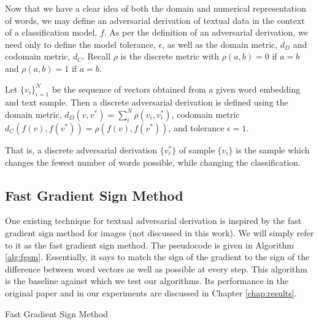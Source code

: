 \label{sec:adversarial_text_derivation}
\noindent
Now that we have a clear idea of both the domain and numerical representation of words, we may define an adversarial derivation of textual data in the context of a classification model, $f$.  As per the definition of an adversarial derivation, we need only to define the model tolerance, $\epsilon$, as well as the domain metric, $d_D$ and codomain metric, $d_C$.  Recall $\rho$ is the discrete metric with $\rho(a,b) = 0$ if $a=b$ and $\rho(a,b)=1$ if $a=b$.

\begin{definition}
Let $\{v_i\}_{i=1}^N$ be the sequence of vectors obtained from a given word embedding and text sample.  Then a discrete adversarial derivation is defined using the domain metric, $d_D(v,v^*) = \sum_i^N\rho(v_i,v_i^*)$, codomain metric $d_C(f(v),f(v^*)) = \rho(f(v),f(v^*))$, and tolerance $\epsilon = 1$.
\end{definition}

\noindent
That is, a discrete adversarial derivation $\{v_i^*\}$ of sample $\{v_i\}$ is the sample which changes the fewest number of words possible, while changing the classification.  
\subsection{Fast Gradient Sign Method}
One existing technique for textual adversarial derivation is inspired by the fast gradient sign method for images (not discussed in this work).  We will simply refer to it as the fast gradient sign method.  The pseudocode is given in Algorithm \ref{alg:fgsm}. \cite{np16}  Essentially, it says to match the sign of the gradient to the sign of the difference between word vectors as well as possible at every step.  This algorithm is the baseline against which we test our algorithms.  Its performance in the original paper and in our experiments are discussed in Chapter \ref{chap:results}.

\begin{algorithm}
\begin{algorithmic}[1]
\begin{spacing}{1.0}
\caption{Fast Gradient Sign Method}
 
 
 
 
     
     
\EndWhile
\label{alg:fgsm}
\end{spacing}
\end{algorithmic}
\end{algorithm}


